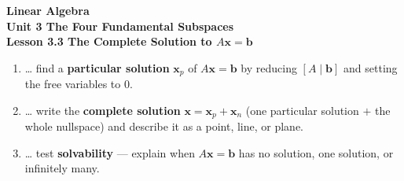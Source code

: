 \documentclass[10pt]{article}
\begin{document}
\vspace{-0.8in}

\begin{center}
  {\color{white}\textbf{\LARGE Linear Algebra}}\\[4pt]
  {\color{blushmid}\large\textbf{Unit 3 \quad The Four Fundamental Subspaces}}\\[6pt]
  {\color{white}\textbf{\large Lesson 3.3 \quad The Complete Solution to $A\mathbf{x}=\mathbf{b}$}}
\end{center}

\vspace{0.22in}
\namedateperiod
\vspace{0.18in}

\begin{learningtargetbox}
\small
\begin{enumerate}[leftmargin=1.5em, itemsep=5pt]
  \item \ldots{} find a \textbf{particular solution} $\mathbf{x}_p$ of $A\mathbf{x}=\mathbf{b}$ by reducing $[A\mid\mathbf{b}]$ and setting the free variables to $0$.
  \item \ldots{} write the \textbf{complete solution} $\mathbf{x}=\mathbf{x}_p+\mathbf{x}_n$ (one particular solution $+$ the whole nullspace) and describe it as a point, line, or plane.
  \item \ldots{} test \textbf{solvability} --- explain when $A\mathbf{x}=\mathbf{b}$ has no solution, one solution, or infinitely many.
\end{enumerate}
\end{learningtargetbox}

\vspace{0.14in}
\end{document}
